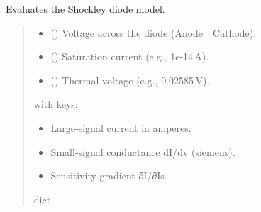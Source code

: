 \documentclass[letterpaper,10pt,english]{sphinxmanual}
\begin{document}
\begin{fulllineitems}
\label{\detokenize{diode_mosfet_models:evaluate_diode}}
\pysigstartsignatures
\pysiglinewithargsret
{}
{\sphinxparamcomma {}\sphinxparamcomma {}}
{}
\pysigstopsignatures
\sphinxAtStartPar
Evaluates the Shockley diode model.
\begin{quote}\begin{description}
\begin{itemize}
\item {} 
\sphinxAtStartPar
{} () \textendash{} Voltage across the diode (Anode \textendash{} Cathode).

\item {} 
\sphinxAtStartPar
{} () \textendash{} Saturation current (e.g., 1e‑14 A).

\item {} 
\sphinxAtStartPar
{} () \textendash{} Thermal voltage (e.g., 0.02585 V).

\end{itemize}

\sphinxAtStartPar

\sphinxAtStartPar
{} with keys:
\begin{itemize}
\item {} 
\sphinxAtStartPar
{} \textendash{} Large‑signal current in amperes.

\item {} 
\sphinxAtStartPar
{}   \textendash{} Small‑signal conductance dI/dv (siemens).

\item {} 
\sphinxAtStartPar
{}
\textendash{} Sensitivity gradient ∂I/∂Is.

\end{itemize}


\sphinxAtStartPar
dict

\end{description}\end{quote}

\end{fulllineitems}
\end{document}

